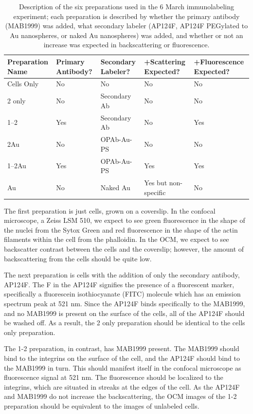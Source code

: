 \begin{table}[hb]
\caption{Description of the six preparations used in the 6 March immunolabeling experiment; each preparation is described by whether the primary antibody (MAB1999) was added, what secondary labeler (AP124F, AP124F PEGylated to Au nanospheres, or naked Au nanospheres) was added, and whether or not an increase was expected in backscattering or fluorescence.}
\begin{minipage}{\linewidth}
\setlength{\tymax}{0.5\linewidth}
\centering
\small
\begin{tabular}{lp{2cm}p{2cm}p{2cm}p{2cm}} \toprule
Preparation Name&Primary Antibody?&Secondary Labeler?&+Scattering Expected?&+Fluorescence Expected?\\
\midrule
Cells Only&No&No&No&No\\
2 only&No&Secondary Ab&No&No\\
1--2&Yes&Secondary Ab&No&Yes\\
2Au&No&OPAb-Au-PS&No&No\\
1--2Au&Yes&OPAb-Au-PS&Yes&Yes\\
Au&No&Naked Au&Yes but non-specific&No\\

\bottomrule

\end{tabular}
\end{minipage}
\label{tab:6MarchPrepTable}
\end{table}

The first preparation is just cells, grown on a coverslip. In the confocal microscope, a Zeiss LSM 510, we expect to see green fluorescence in the shape of the nuclei from the Sytox Green and red fluorescence in the shape of the actin filaments within the cell from the phalloidin. In the OCM, we expect to see backscatter contrast between the cells and the coverslip; however, the amount of backscattering from the cells should be quite low.

The next preparation is cells with the addition of only the secondary antibody, AP124F. The F in the AP124F signifies the presence of a fluorescent marker, specifically a fluorescein isothiocyanate (FITC) molecule which has an emission spectrum peak at 521 nm. Since the AP124F binds specifically to the MAB1999, and no MAB1999 is present on the surface of the cells, all of the AP124F should be washed off. As a result, the 2 only preparation should be identical to the cells only preparation.

The 1-2 preparation, in contrast, has MAB1999 present. The MAB1999 should bind to the integrins on the surface of the cell, and the AP124F should bind to the MAB1999 in turn. This should manifest itself in the confocal microscope as fluorescence signal at 521 nm. The fluorescence should be localized to the integrins, which are situated in streaks at the edges of the cell. As the AP124F and MAB1999 do not increase the backscattering, the OCM images of the 1-2 preparation should be equivalent to the images of unlabeled cells.

